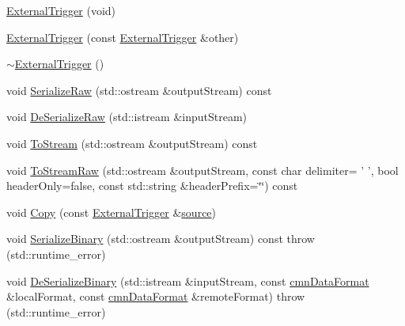 \begin{DoxyCompactItemize}
\item 
\hyperlink{classsvl_filter_source_video_capture_types_1_1_external_trigger_af731b4c50a28f4c021e99daca724d8ad}{External\-Trigger} (void)
\item 
\hyperlink{classsvl_filter_source_video_capture_types_1_1_external_trigger_a4099dc2309759544b57a5e8dcc305eb7}{External\-Trigger} (const \hyperlink{classsvl_filter_source_video_capture_types_1_1_external_trigger}{External\-Trigger} \&other)
\item 
\hyperlink{classsvl_filter_source_video_capture_types_1_1_external_trigger_a28abad13e7e924d06d8929200b0fc3df}{$\sim$\-External\-Trigger} ()
\item 
void \hyperlink{classsvl_filter_source_video_capture_types_1_1_external_trigger_ac7d183abd22bf87fe7817ced87df38c6}{Serialize\-Raw} (std\-::ostream \&output\-Stream) const 
\item 
void \hyperlink{classsvl_filter_source_video_capture_types_1_1_external_trigger_a2773c71ca3f88e0168feb6d7dd6e00b2}{De\-Serialize\-Raw} (std\-::istream \&input\-Stream)
\item 
void \hyperlink{classsvl_filter_source_video_capture_types_1_1_external_trigger_a3ffd3d60d84493302e05482376a850e4}{To\-Stream} (std\-::ostream \&output\-Stream) const 
\item 
void \hyperlink{classsvl_filter_source_video_capture_types_1_1_external_trigger_adb614b2edae33908607bfcc6a8e48e25}{To\-Stream\-Raw} (std\-::ostream \&output\-Stream, const char delimiter= ' ', bool header\-Only=false, const std\-::string \&header\-Prefix=\char`\"{}\char`\"{}) const 
\item 
void \hyperlink{classsvl_filter_source_video_capture_types_1_1_external_trigger_a6cf962483122b2c09ae62ea7ece0426d}{Copy} (const \hyperlink{classsvl_filter_source_video_capture_types_1_1_external_trigger}{External\-Trigger} \&\hyperlink{classsvl_filter_source_video_capture_types_1_1_external_trigger_a90c5c2fc64176eb2220cdd9890795301}{source})
\item 
void \hyperlink{classsvl_filter_source_video_capture_types_1_1_external_trigger_af9dcb778660c63ac0f7cb757bfc3cb53}{Serialize\-Binary} (std\-::ostream \&output\-Stream) const   throw (std\-::runtime\-\_\-error)
\item 
void \hyperlink{classsvl_filter_source_video_capture_types_1_1_external_trigger_aa0dc802a0bddc29f459467f29750a1dc}{De\-Serialize\-Binary} (std\-::istream \&input\-Stream, const \hyperlink{classcmn_data_format}{cmn\-Data\-Format} \&local\-Format, const \hyperlink{classcmn_data_format}{cmn\-Data\-Format} \&remote\-Format)  throw (std\-::runtime\-\_\-error)

\end{DoxyCompactItemize}
